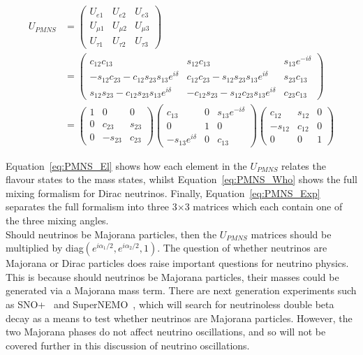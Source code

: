 \begin{align}
  U_{PMNS} &= \begin{pmatrix} U_{e1} & U_{e2} & U_{e3} \\ U_{\mu1} & U_{\mu2} & U_{\mu3} \\ U_{\tau1} & U_{\tau2} & U_{\tau3} \end{pmatrix} \label{eq:PMNS_El} \\
  &= \begin{pmatrix} c_{12}c_{13}                                  & s_{12}c_{13}                                  & s_{13}e^{-i\delta} \\
                     -s_{12}c_{23} - c_{12}s_{23}s_{13}e^{i\delta} & c_{12}c_{23} - s_{12}s_{23}s_{13}e^{i\delta}  & s_{23}c_{13}      \\
                     s_{12}s_{23} - c_{12}s_{23}s_{13}e^{i\delta}  & -c_{12}s_{23} - s_{12}c_{23}s_{13}e^{i\delta} & c_{23}c_{13}      \end{pmatrix} \label{eq:PMNS_Who}  \\
  &= \begin{pmatrix} 1 & 0 & 0                       \\ 0 & c_{23} & s_{23}  \\ 0 & -s_{23} & c_{23}            \end{pmatrix}
     \begin{pmatrix} c_{13} & 0 & s_{13}e^{-i\delta} \\ 0 & 1 & 0            \\ -s_{13}e^{i\delta} & 0 & c_{13} \end{pmatrix}
     \begin{pmatrix} c_{12} & s_{12} & 0             \\ -s_{12} & c_{12} & 0 \\ 0 & 0 & 1                       \end{pmatrix} \label{eq:PMNS_Exp}
\end{align}

Equation~\ref{eq:PMNS_El} shows how each element in the $U_{PMNS}$ relates the flavour states to the mass states, whilst Equation~\ref{eq:PMNS_Who} shows the full mixing formalism for Dirac neutrinos. Finally, Equation~\ref{eq:PMNS_Exp} separates the full formalism into three 3$\times$3 matrices which each contain one of the three mixing angles. \\

Should neutrinos be Majorana particles, then the $U_{PMNS}$ matrices should be multiplied by diag$\left(e^{i\alpha_1/2}, e^{i\alpha_2/2}, 1\right)$. The question of whether neutrinos are Majorana or Dirac particles does raise important questions for neutrino physics. This is because should neutrinos be Majorana particles, their masses could be generated via a Majorana mass term. There are next generation experiments such as SNO+~\citep{SNO+} and SuperNEMO~\citep{SuperNEMO}, which will search for neutrinoless double beta decay as a means to test whether neutrinos are Majorana particles. However, the two Majorana phases do not affect neutrino oscillations, and so will not be covered further in this discussion of neutrino oscillations. \\

